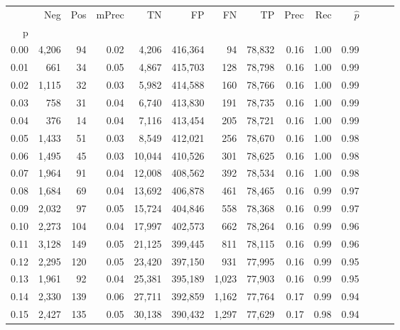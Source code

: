 \begin{tabular}{rrrrrrrrrrrrrr}
\toprule
{} &     Neg &    Pos & mPrec &       TN &       FP &      FN &      TP &  Prec &   Rec & $\hat{p}$ \\
p    &         &        &       &          &          &         &         &       &       &           \\
\midrule
0.00 &   4,206 &     94 &  0.02 &    4,206 &  416,364 &      94 &  78,832 &  0.16 &  1.00 &      0.99 \\
0.01 &     661 &     34 &  0.05 &    4,867 &  415,703 &     128 &  78,798 &  0.16 &  1.00 &      0.99 \\
0.02 &   1,115 &     32 &  0.03 &    5,982 &  414,588 &     160 &  78,766 &  0.16 &  1.00 &      0.99 \\
0.03 &     758 &     31 &  0.04 &    6,740 &  413,830 &     191 &  78,735 &  0.16 &  1.00 &      0.99 \\
0.04 &     376 &     14 &  0.04 &    7,116 &  413,454 &     205 &  78,721 &  0.16 &  1.00 &      0.99 \\
0.05 &   1,433 &     51 &  0.03 &    8,549 &  412,021 &     256 &  78,670 &  0.16 &  1.00 &      0.98 \\
0.06 &   1,495 &     45 &  0.03 &   10,044 &  410,526 &     301 &  78,625 &  0.16 &  1.00 &      0.98 \\
0.07 &   1,964 &     91 &  0.04 &   12,008 &  408,562 &     392 &  78,534 &  0.16 &  1.00 &      0.98 \\
0.08 &   1,684 &     69 &  0.04 &   13,692 &  406,878 &     461 &  78,465 &  0.16 &  0.99 &      0.97 \\
0.09 &   2,032 &     97 &  0.05 &   15,724 &  404,846 &     558 &  78,368 &  0.16 &  0.99 &      0.97 \\
0.10 &   2,273 &    104 &  0.04 &   17,997 &  402,573 &     662 &  78,264 &  0.16 &  0.99 &      0.96 \\
0.11 &   3,128 &    149 &  0.05 &   21,125 &  399,445 &     811 &  78,115 &  0.16 &  0.99 &      0.96 \\
0.12 &   2,295 &    120 &  0.05 &   23,420 &  397,150 &     931 &  77,995 &  0.16 &  0.99 &      0.95 \\
0.13 &   1,961 &     92 &  0.04 &   25,381 &  395,189 &   1,023 &  77,903 &  0.16 &  0.99 &      0.95 \\
0.14 &   2,330 &    139 &  0.06 &   27,711 &  392,859 &   1,162 &  77,764 &  0.17 &  0.99 &      0.94 \\
0.15 &   2,427 &    135 &  0.05 &   30,138 &  390,432 &   1,297 &  77,629 &  0.17 &  0.98 &      0.94 \\

\end{tabular}
